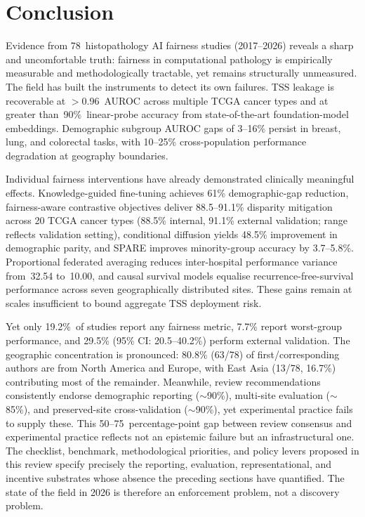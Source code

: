 
\section{Conclusion}
\label{sec:conclusion}

Evidence from 78~histopathology AI fairness studies (2017--2026) reveals a sharp and uncomfortable truth: fairness in computational pathology is empirically measurable and methodologically tractable, yet remains structurally unmeasured. The field has built the instruments to detect its own failures. TSS leakage is recoverable at $>$0.96~AUROC across multiple TCGA cancer types and at greater than~90\%~linear-probe accuracy from state-of-the-art foundation-model embeddings. Demographic subgroup AUROC gaps of 3--16\% persist in breast, lung, and colorectal tasks, with 10--25\% cross-population performance degradation at geography boundaries.

Individual fairness interventions have already demonstrated clinically meaningful effects. Knowledge-guided fine-tuning achieves 61\% demographic-gap reduction, fairness-aware contrastive objectives deliver 88.5--91.1\% disparity mitigation across 20 TCGA cancer types (88.5\% internal, 91.1\% external validation; range reflects validation setting), conditional diffusion yields 48.5\% improvement in demographic parity, and SPARE improves minority-group accuracy by 3.7--5.8\%. Proportional federated averaging reduces inter-hospital performance variance from~32.54 to~10.00, and causal survival models equalise recurrence-free-survival performance across seven geographically distributed sites. These gains remain at scales insufficient to bound aggregate TSS deployment risk.

Yet only 19.2\%~of studies report any fairness metric, 7.7\% report worst-group performance, and 29.5\% (95\% CI: 20.5--40.2\%) perform external validation. The geographic concentration is pronounced: 80.8\% (63/78) of first/corresponding authors are from North America and Europe, with East Asia (13/78, 16.7\%) contributing most of the remainder. Meanwhile, review recommendations consistently endorse demographic reporting ($\sim$90\%), multi-site evaluation ($\sim$85\%), and preserved-site cross-validation ($\sim$90\%), yet experimental practice fails to supply these. This 50--75~percentage-point gap between review consensus and experimental practice reflects not an epistemic failure but an infrastructural one. The checklist, benchmark, methodological priorities, and policy levers proposed in this review specify precisely the reporting, evaluation, representational, and incentive substrates whose absence the preceding sections have quantified. The state of the field in 2026 is therefore an enforcement problem, not a discovery problem.

